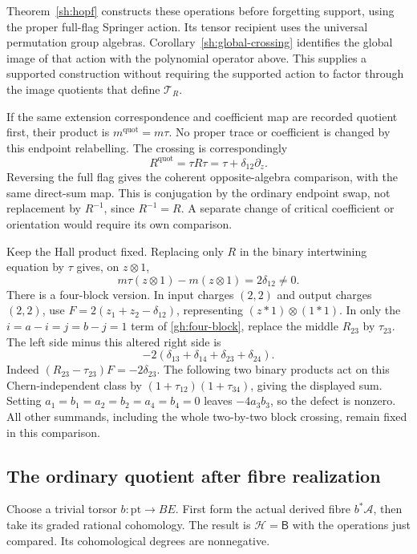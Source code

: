 Theorem~\ref{sh:hopf} constructs these operations before
forgetting support, using the proper full-flag Springer action.
Its tensor recipient uses the universal permutation group
algebras. Corollary~\ref{sh:global-crossing} identifies the
global image of that action with the polynomial operator above.
This supplies a supported construction without requiring the
supported action to factor through the image quotients that
define $\mathcal T_R$.

If the same extension correspondence and coefficient map are recorded
quotient first, their product is $m^{\mathrm{quot}}=m\tau$.
No proper trace or coefficient is changed by this endpoint relabelling.
The crossing is correspondingly
\[
 R^{\mathrm{quot}}=\tau R\tau=\tau+\delta_{12}\partial_z.
\]
Reversing the full flag gives the coherent opposite-algebra comparison,
with the same direct-sum map. This is conjugation by the ordinary
endpoint swap, not replacement by $R^{-1}$, since $R^{-1}=R$.
A separate change of critical coefficient or orientation would require
its own comparison.

\begin{example}\label{gh:crossing-example}
Keep the Hall product fixed. Replacing only $R$ in the binary
intertwining equation by $\tau$ gives, on $z\otimes1$,
\[
 m\tau(z\otimes1)-m(z\otimes1)=2\delta_{12}\ne0.
\]
There is a four-block version. In input charges $(2,2)$ and output
charges $(2,2)$, use
$F=2(z_1+z_2-\delta_{12})$, representing
$(z*1)\otimes(1*1)$.
In only the $i=a-i=j=b-j=1$ term of \eqref{gh:four-block},
replace the middle $R_{23}$ by $\tau_{23}$.
The left side minus this altered right side is
\[
 -2(\delta_{13}+\delta_{14}+\delta_{23}+\delta_{24}).
\]
Indeed $(R_{23}-\tau_{23})F=-2\delta_{23}$.
The following two binary products act on this Chern-independent
class by $(1+\tau_{12})(1+\tau_{34})$, giving the displayed sum.
Setting $a_1=b_1=a_2=b_2=a_4=b_4=0$ leaves $-4a_3b_3$,
so the defect is nonzero. All other summands, including the whole
two-by-two block crossing, remain fixed in this comparison.
\end{example}

\subsection{The ordinary quotient after fibre realization}

Choose a trivial torsor $b:\mathrm{pt}\to BE$.
First form the actual derived fibre $b^*\mathcal A$, then take its
graded rational cohomology. The result is $\mathcal H=\mathsf B$
with the operations just compared. Its cohomological degrees are
nonnegative.


